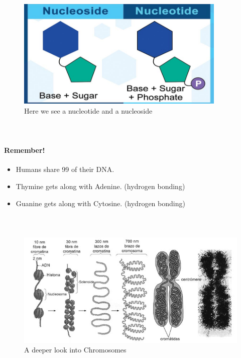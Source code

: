 \paragraph{\\}
\begin{figure}[htbp]
    \centerline{\includegraphics[width=100mm]{nucleotide.jpg}}
    \caption{Here we see a nucleotide and a nucleoside}
    \label{fig2}
\end{figure}

\paragraph{\\}
\paragraph{Remember!}

\begin{itemize}
    \item Humans share 99 of their DNA.
    \item Thymine gets along with Adenine. (hydrogen bonding)
    \item Guanine gets along with Cytosine. (hydrogen bonding)
\end{itemize}

\paragraph{\\}
\begin{figure}[htbp]
    \centerline{\includegraphics[width=185mm]{adn3.jpg}}
    \caption{A deeper look into Chromosomes}
    \label{fig3}
\end{figure}